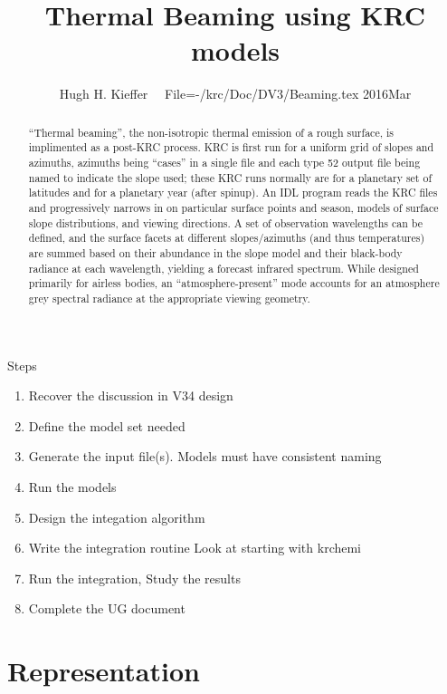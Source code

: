 \documentclass{article}
\title{Thermal Beaming using KRC models}
\author{Hugh H. Kieffer  \ \ File=-/krc/Doc/DV3/Beaming.tex  2016Mar}
\begin{document}
\maketitle

\begin{abstract}
``Thermal beaming'', the non-isotropic thermal emission of a rough surface, is
  implimented as a post-KRC process.  KRC is first run for a uniform grid of
  slopes and azimuths, azimuths being ``cases'' in a single file and each type
  52 output file being named to indicate the slope used; these KRC runs normally
  are for a planetary set of latitudes and for a planetary year (after
  spinup). An IDL program reads the KRC files and progressively narrows in on
  particular surface points and season, models of surface slope distributions,
  and viewing directions. A set of observation wavelengths can be defined, and
  the surface facets at different slopes/azimuths (and thus temperatures) are
  summed based on their abundance in the slope model and their black-body
  radiance at each wavelength, yielding a forecast infrared spectrum. While
  designed primarily for airless bodies, an ``atmosphere-present'' mode accounts
  for an atmosphere grey spectral radiance at the appropriate viewing geometry.
\end{abstract}

Steps \begin{enumerate}    %
\item Recover the discussion in V34 design 
\item Define the model set needed
 \item Generate the input file(s). Models must have consistent naming
 \item Run the models
 \item Design the integation algorithm
 \item Write the integration routine
\qi Look at starting with krchemi
 \item Run the integration, Study the results
 \item Complete the UG document
\end{enumerate}

\section{Representation}
\end{document}
